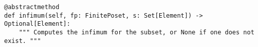 \par\begin{minipage}{79ex}
\begin{verbatim}
@abstractmethod
def infimum(self, fp: FinitePoset, s: Set[Element]) -> Optional[Element]:
    """ Computes the infimum for the subset, or None if one does not exist. """
\end{verbatim}
\end{minipage}\par